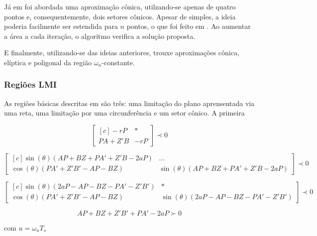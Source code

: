 Já em \cite{WISNIEWSKI2017} foi abordada uma aproximação cônica, utilzando-se apenas de quatro pontos e, consequentemente, dois setores cônicos. Apesar de simples, a ideia poderia facilmente ser estendida para $n$ pontos, o que foi feito em \cite{WISNIEWSKI2019}. Ao aumentar a área a cada iteração, o algoritmo verifica a solução proposta.

E finalmente, utilizando-se das ideias anteriores, \cite{CHIQUETO2021} trouxe aproximações cônica, elíptica e poligonal da região $\omega_n$-constante.

\subsubsection{Regiões LMI}
As regiões básicas descritas em \cite{CHILALI1996} são três: uma limitação do plano aprensentada via uma reta, uma limitação por uma circunferência e um setor cônico. A primeira

\begin{equation}
  \begin{bmatrix*}[c]
    -rP       & * \\
    PA + Z'B  & -rP
  \end{bmatrix*}
  \prec 0\label{eq:LMIEstabilidadeRelativa}
\end{equation}

\begin{equation}
  \begin{bmatrix*}[c]
    \sin{(\theta)(AP + BZ + PA' + Z'B -2aP)} &  \dots \\
    \cos{(\theta)(PA' + Z'B'- AP - BZ)}      &  \sin{(\theta)(AP + BZ + PA' + Z'B -2aP)}
  \end{bmatrix*}
  \prec 0\label{eq:LMIESetorConicoEsquerdo}
\end{equation}

\begin{equation}
  \begin{bmatrix*}[c]
    \sin{(\theta)(2aP - AP - BZ - PA' - Z'B')} & * \\
    \cos{(\theta)(PA' + Z'B' - AP - BZ)}       & \sin{(\theta)(2aP - AP - BZ - PA' - Z'B')}
  \end{bmatrix*}
  \prec 0\label{eq:LMIESetorConicoDireito}
\end{equation}

\begin{equation}
  AP + BZ + Z'B' + PA' -2aP\label{eq:LMIRightBounded} \succ 0
\end{equation}

com $u = \omega_nT_s$